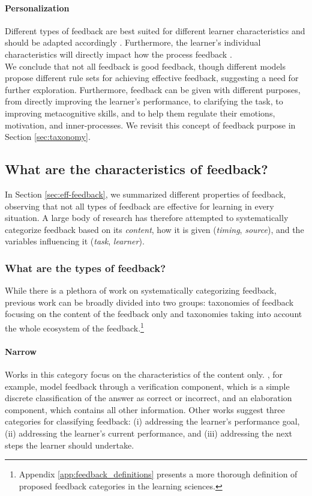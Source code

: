 \paragraph{Personalization} Different types of feedback are best suited for different learner characteristics and should be adapted accordingly \citep{mason_providing_2001}. Furthermore, the learner's individual characteristics will directly impact how the process feedback \citep{anastasiya_a_lipnevich_david_a_g_berg_jeffrey_k_smith_toward_2016}. \\

\noindent We conclude that not all feedback is good feedback, though different models propose different rule sets for achieving effective feedback, suggesting a need for further exploration. Furthermore, feedback can be given with different purposes, from directly improving the learner's performance, to clarifying the task, to improving metacognitive skills, and to help them regulate their emotions, motivation, and inner-processes. We revisit this concept of feedback purpose in Section \ref{sec:taxonomy}.

\subsection{What are the characteristics of feedback?}
In Section \ref{sec:eff-feedback}, we summarized different properties of feedback, observing that not all types of feedback are effective for learning in every situation. A large body of research has therefore attempted to systematically categorize feedback based on its \textit{content}, how it is given (\textit{timing}, \textit{source}), and the variables influencing it (\textit{task}, \textit{learner}).

\subsubsection{What are the types of feedback?}
While there is a plethora of work on systematically categorizing feedback, previous work can be broadly divided into two groups: taxonomies of feedback focusing on the content of the feedback only and taxonomies taking into account the whole ecosystem of the feedback.\footnote{Appendix \ref{app:feedback_definitions} presents a more thorough definition of proposed feedback categories in the learning sciences.}

\paragraph{Narrow} 
Works in this category focus on the characteristics of the content only. \citet{kulhavy_feedback_1989}, for example, model feedback through a verification component, which is a simple discrete classification of the answer as correct or incorrect, and an elaboration component, which contains all other information. Other works \cite{hattie_power_2007, panadero_review_2022} suggest three categories for classifying feedback: (i) addressing the learner's performance goal, (ii) addressing the learner's current performance, and (iii) addressing the next steps the learner should undertake.

